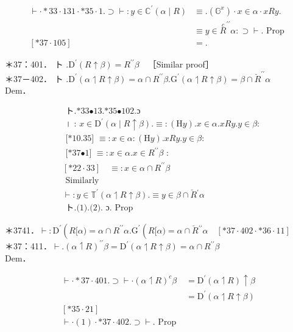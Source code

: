 \documentclass[10pt]{article}
\begin{document}
$$
\begin{aligned}
\vdash \cdot * 33 \cdot 131 \cdot * 35 \cdot 1 . \supset \vdash: y \in \mathbb{C}^{\prime}(\alpha \mid R) & \equiv .\left(\mathbb{G}^{x}\right) \cdot x \in \alpha \cdot x R y . \\
& \equiv y \in \stackrel{c}{R}^{\prime \prime} \alpha: \supset \vdash . \text { Prop } \\
{[* 37 \cdot 105] } & =.
\end{aligned}
$$

＊37：401． ト $. \mathrm{D}^{\prime}(R \uparrow \beta)=R^{\prime \prime} \beta \quad$［Similar proof］\\
＊37－402． ト $. \mathrm{D}^{\prime}(\alpha \upharpoonleft R \uparrow \beta)=\alpha \cap R^{\prime \prime} \beta . \mathrm{G}^{\prime}(\alpha \upharpoonleft R \uparrow \beta)=\beta \cap \breve{R}^{\prime \prime} \alpha$\\
Dem．


\begin{align*}
& \text { ト.*33•13.*35•102.ɔ } \\
& \text { । : } x \in \mathrm{D}^{\prime}(\alpha \mid R \uparrow \beta) . \equiv:(\mathrm{H} y) . x \in \alpha . x R y . y \in \beta: \\
& \text { [*10.35] } \equiv: x \in \alpha:(\mathrm{H} y) . x R y . y \in \beta: \\
& \text { [*37•1] } \equiv: x \in \alpha . x \in R^{\prime \prime} \beta \text { : } \\
& {[* 22 \cdot 33] \quad \equiv: x \in \alpha \cap R^{\prime \prime} \beta}  \tag{1}\\
& \text { Similarly } \\
& \vdash: y \in \mathbb{T}^{\prime}(\alpha \upharpoonleft R \uparrow \beta) . \equiv y \in \beta \cap \breve{R}{ }^{\prime} \alpha  \tag{2}\\
& \text { ト.(1).(2). ɔ. Prop }
\end{align*}


＊3741．$\vdash: \mathrm{D}^{\prime}\left(R[\alpha)=\alpha \cap R^{\prime \prime} \alpha . \mathrm{G}^{\prime}\left(R[\alpha)=\alpha \cap \breve{R}{ }^{\prime \prime} \alpha \quad[* 37 \cdot 402 \cdot * 36 \cdot 11]\right.\right.$\\
＊37：411．$\vdash .(\alpha \upharpoonleft R)^{\prime \prime} \beta=\mathrm{D}^{\prime}(\alpha \upharpoonleft R \uparrow \beta)=\alpha \cap R^{\prime \prime} \beta$\\
Dem．


\begin{align*}
\vdash \cdot * 37 \cdot 401 . \supset \vdash \cdot(\alpha \upharpoonleft R)^{c} \beta & =\mathrm{D}^{\prime}(\alpha \upharpoonleft R) \uparrow \beta \\
& =\mathrm{D}^{\prime}(\alpha \upharpoonleft R \uparrow \beta)  \tag{1}\\
{[* 35 \cdot 21] } & \\
\vdash \cdot(1) \cdot * 37 \cdot 402 . \supset \vdash . \text { Prop } &
\end{align*}
\end{document}

